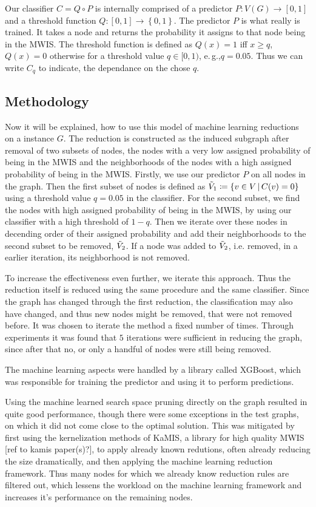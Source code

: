 \documentclass[acmsmall,nonacm,screen,review]{acmart}
\newcommand{\set}[1]{\left\{ #1\right\}}
\newcommand{\ra}{\rightarrow}
\newcommand{\eg}{e.\,g.,\xspace}
\begin{document}
Our classifier $C = Q \circ P$ is internally comprised of a predictor $P : V(G) \ra [0,1]$ and a threshold function $Q : [0,1] \ra \set{0,1}$. 
The predictor $P$ is what really is trained. It takes a node and returns the probability it assigns to that node being in the MWIS. 
The threshold function is defined as $Q(x)=1$ iff $x\geq q$, $Q(x)=0$ otherwise for a threshold value $q\in[0, 1)$, \eg $q=0.05$.
Thus we can write $C_q$ to indicate, the dependance on the chose $q$.


\subsection{Methodology}

Now it will be explained, how to use this model of machine learning reductions on a instance $G$.
The reduction is constructed as the induced subgraph after removal of two subsets of nodes, the nodes with a very low assigned probability of being in the MWIS and the neighborhoods of the nodes with a high assigned probability of being in the MWIS.
Firstly, we use our predictor $P$ on all nodes in the graph.
Then the first subset of nodes is defined as 
$\Tilde{V}_1 \coloneqq \set{v\in V \,|\, C(v) = 0}$ using a threshold value $q=0.05$ in the classifier.
For the second subset, we find the nodes with high assigned probability of being in the MWIS, by using our classifier with a high threshold of $1-q$. Then we iterate over these nodes in decending order of their assigned probability and add their neighborhoods to the second subset to be removed, $\Tilde{V}_2$. If a node was added to $\Tilde{V}_2$, i.e. removed, in a earlier iteration, its neighborhood is not removed.

To increase the effectiveness even further, we iterate this approach. Thus the reduction itself is reduced using the same procedure and the same classifier. Since the graph has changed through the first reduction, the classification may also have changed, and thus new nodes might be removed, that were not removed before. It was chosen to iterate the method a fixed number of times. Through experiments it was found that $5$ iterations were sufficient in reducing the graph, since after that no, or only a handful of nodes were still being removed.

The machine learning aspects were handled by a library called XGBoost, which was responsible for training the predictor and using it to perform predictions. 

Using the machine learned search space pruning directly on the graph resulted in quite good performance, though there were some exceptions in the test graphs, on which it did not come close to the optimal solution. This was mitigated by first using the kernelization methods of KaMIS, a library for high quality MWIS [ref to kamis paper(s)?], to apply already known redutions, often already reducing the size dramatically, and then applying the machine learning reduction framework. Thus many nodes for which we already know reduction rules are filtered out, which lessens the workload on the machine learning framework and increases it's performance on the remaining nodes.
\end{document}
